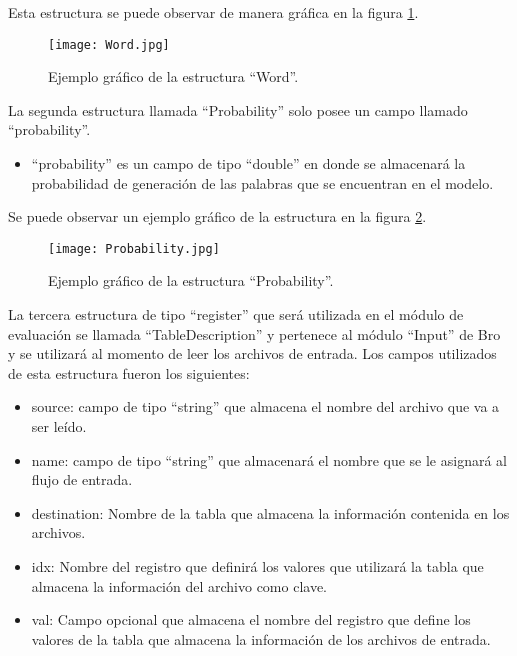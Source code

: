 Esta estructura se puede observar de manera gráfica en la figura \ref{fig:WORD}.

\begin{figure}[tb]
\begin{center}
\texttt{[image: Word.jpg]}
\caption{Ejemplo gráfico de la estructura ``Word''.}
\label{fig:WORD}
\end{center}
\end{figure}	

La segunda estructura llamada ``Probability'' solo posee un campo llamado ``probability''.
\begin{itemize}
\item ``probability'' es un campo de tipo ``double'' en donde se almacenará la probabilidad de generación de las palabras que se encuentran en el modelo.
\end{itemize}

Se puede observar un ejemplo gráfico de la estructura en la figura \ref{fig:Probability}.

\begin{figure}[tb]
\begin{center}
\texttt{[image: Probability.jpg]}
\caption{Ejemplo gráfico de la estructura ``Probability''.}
\label{fig:Probability}
\end{center}
\end{figure}	

La tercera estructura de tipo ``register'' que será utilizada en el módulo de evaluación se llamada ``TableDescription'' y pertenece al módulo ``Input'' de Bro y se utilizará al momento de leer los archivos de entrada.
Los campos utilizados de esta estructura fueron los siguientes:
\begin{itemize}
\item source: campo de tipo ``string'' que almacena el nombre del archivo
que va a ser leído.
\item name: campo de tipo ``string'' que almacenará el nombre que se le
asignará al flujo de entrada.
\item destination: Nombre de la tabla que almacena la información contenida
en los archivos.
\item idx: Nombre del registro que definirá los valores que utilizará la tabla que almacena la información del archivo como clave.
\item val: Campo opcional que almacena el nombre del registro que define
los valores de la tabla que almacena la información de los archivos de
entrada.
\end{itemize}

